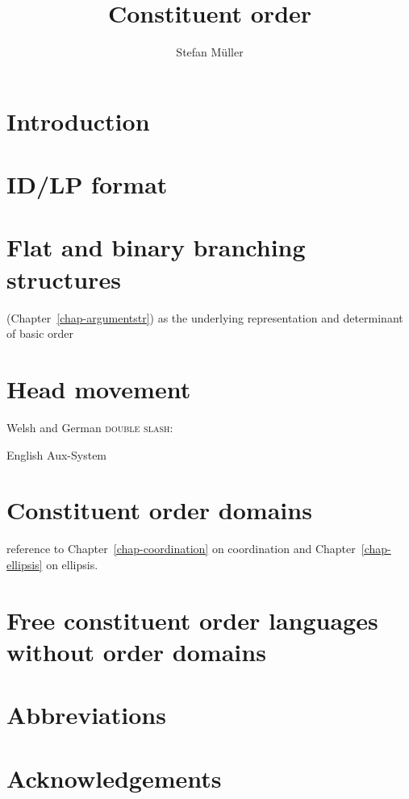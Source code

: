 \documentclass[output=paper]{langsci/langscibook}
\author{%
	Stefan Müller\affiliation{Humboldt-Universität zu Berlin}%
}
\title{Constituent order}
\begin{document}
\label{chap:constituents}

\section{Introduction} 



\section{ID/LP format}

\citet{GKPS85a}

\section{Flat and binary branching structures}

\argst (Chapter~\ref{chap-argumentstr}) as the underlying representation and determinant of basic order

\section{Head movement}

Welsh and German \textsc{double slash}:

\citet{Borsley89,MuellerGS}

English Aux-System

\citet{Sag2018a}

\section{Constituent order domains}

\citet{Reape94a,Kathol2001a,Mueller2004b}

reference to Chapter~\ref{chap-coordination} on coordination and Chapter~\ref{chap-ellipsis} on ellipsis.

\section{Free constituent order languages without order domains}

\citet{Bender2008a}


 
\section*{Abbreviations}
\section*{Acknowledgements}

\printbibliography[heading=subbibliography,notkeyword=this] 
\end{document}
